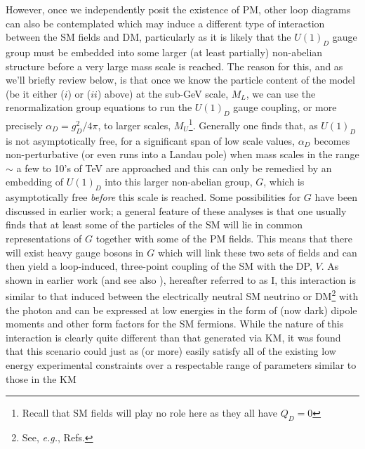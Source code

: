 \documentclass[14pt]{article}
\def\eg{{\it e.g.}}
\begin{document}
However, once we independently posit the existence of PM, other loop diagrams can also be contemplated which may induce a different type of interaction between the SM fields and DM, particularly as 
it is likely that the $U(1)_D$ gauge group must be embedded into some larger (at least partially) non-abelian structure before a very large mass scale 
is reached\cite{Davoudiasl:2015hxa,Reilly:2023frg,Rizzo:2022qan,Rizzo:2022lpm}. The reason for this, and as we'll briefly review below, is that once we know the particle content of the model 
(be it either ($i$) or ($ii$) above) at the sub-GeV scale, $M_L$, we can use the renormalization group equations to run the $U(1)_D$ gauge coupling, or more precisely $\alpha_D=g_D^2/4\pi$, to larger 
scales, $M_U${\footnote {Recall that SM fields will play no role here as they all have $Q_D=0$}}. 
Generally one finds that, as $U(1)_D$ is not asymptotically free, for a significant span of low scale values, $\alpha_D$ becomes non-perturbative (or even runs into a Landau pole) when 
mass scales in the range $\sim$ a few to 10's of TeV are approached and this can only be remedied by an embedding of $U(1)_D$ into this larger non-abelian group, $G$, which is asymptotically 
free {\it before} this scale is reached. Some possibilities for $G$ have been discussed in earlier work\cite{Rizzo:2018vlb,Rueter:2019wdf,Kim:2019oyh,Rueter:2020qhf,Wojcik:2020wgm,Rizzo:2021lob,Rizzo:2022qan,Wojcik:2022rtk,Rizzo:2022jti,Rizzo:2022lpm,Wojcik:2022woa,Carvunis:2022yur,Verma:2022nyd,Rizzo:2023qbj,Wojcik:2023ggt,Rizzo:2023kvy}; a general feature of these analyses is that one usually finds that at least some of the particles of the SM will lie in common 
representations of $G$ together with some of the PM fields. This means that there will exist heavy gauge bosons in $G$ which will link these two sets of fields and can then yield a 
loop-induced, three-point coupling of the SM with the DP, $V$. As shown in earlier work\cite{Rizzo:2021lob} (and see also \cite{Barducci:2021egn}), hereafter referred to as I, this interaction is 
similar to that induced between the electrically neutral SM neutrino or DM{\footnote {See, \eg, Refs.\cite{Hambye:2021xvd,Sharma:2023jdo}}}  
with the photon and can be expressed at low energies in the form of (now dark) dipole moments and other form factors for the SM fermions. While the nature of this interaction is clearly quite different than that generated via KM, it was found that this scenario could just as (or more) easily satisfy all of the existing low energy 
experimental constraints over a respectable range of parameters similar to those in the KM 
\end{document}
